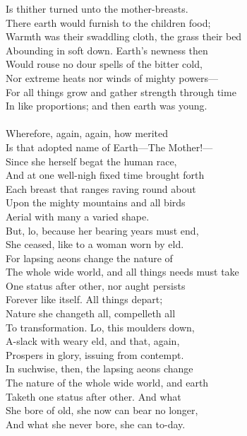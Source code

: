 Is thither turned unto the mother-breasts.\\
There earth would furnish to the children food;\\
Warmth was their swaddling cloth, the grass their bed\\
Abounding in soft down. Earth's newness then\\
Would rouse no dour spells of the bitter cold,\\
Nor extreme heats nor winds of mighty powers—\\
For all things grow and gather strength through time\\
In like proportions; and then earth was young.\\
\\
Wherefore, again, again, how merited\\
Is that adopted name of Earth—The Mother!—\\
Since she herself begat the human race,\\
And at one well-nigh fixed time brought forth\\
Each breast that ranges raving round about\\
Upon the mighty mountains and all birds\\
Aerial with many a varied shape.\\
But, lo, because her bearing years must end,\\
She ceased, like to a woman worn by eld.\\
For lapsing aeons change the nature of\\
The whole wide world, and all things needs must take\\
One status after other, nor aught persists\\
Forever like itself. All things depart;\\
Nature she changeth all, compelleth all\\
To transformation. Lo, this moulders down,\\
A-slack with weary eld, and that, again,\\
Prospers in glory, issuing from contempt.\\
In suchwise, then, the lapsing aeons change\\
The nature of the whole wide world, and earth\\
Taketh one status after other. And what\\
She bore of old, she now can bear no longer,\\
And what she never bore, she can to-day.\\
